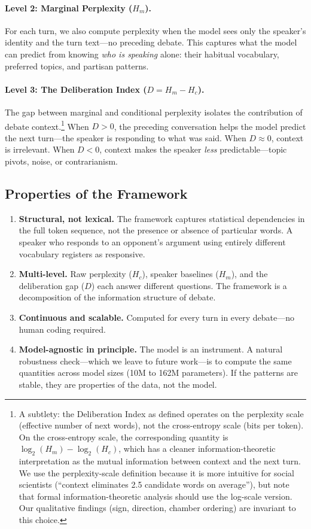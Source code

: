 \documentclass[12pt]{article}
\newcommand{\Hc}{H_c}
\newcommand{\Hm}{H_m}
\newcommand{\DI}{\mathit{D}}
\begin{document}
\paragraph{Level 2: Marginal Perplexity ($\Hm$).} For each turn, we also compute perplexity when the model sees only the speaker's identity and the turn text---no preceding debate. This captures what the model can predict from knowing \textit{who is speaking} alone: their habitual vocabulary, preferred topics, and partisan patterns.

\paragraph{Level 3: The Deliberation Index ($\DI = \Hm - \Hc$).} The gap between marginal and conditional perplexity isolates the contribution of debate context.\footnote{A subtlety: the Deliberation Index as defined operates on the perplexity scale (effective number of next words), not the cross-entropy scale (bits per token). On the cross-entropy scale, the corresponding quantity is $\log_2(\Hm) - \log_2(\Hc)$, which has a cleaner information-theoretic interpretation as the mutual information between context and the next turn. We use the perplexity-scale definition because it is more intuitive for social scientists (``context eliminates 2.5 candidate words on average''), but note that formal information-theoretic analysis should use the log-scale version. Our qualitative findings (sign, direction, chamber ordering) are invariant to this choice.} When $\DI > 0$, the preceding conversation helps the model predict the next turn---the speaker is responding to what was said. When $\DI \approx 0$, context is irrelevant. When $\DI < 0$, context makes the speaker \textit{less} predictable---topic pivots, noise, or contrarianism.

\subsection{Properties of the Framework}

\begin{enumerate}
    \item \textbf{Structural, not lexical.} The framework captures statistical dependencies in the full token sequence, not the presence or absence of particular words. A speaker who responds to an opponent's argument using entirely different vocabulary registers as responsive.
    \item \textbf{Multi-level.} Raw perplexity ($\Hc$), speaker baselines ($\Hm$), and the deliberation gap ($\DI$) each answer different questions. The framework is a decomposition of the information structure of debate.
    \item \textbf{Continuous and scalable.} Computed for every turn in every debate---no human coding required.
    \item \textbf{Model-agnostic in principle.} The model is an instrument. A natural robustness check---which we leave to future work---is to compute the same quantities across model sizes (10M to 162M parameters). If the patterns are stable, they are properties of the data, not the model.
\end{enumerate}
\end{document}
